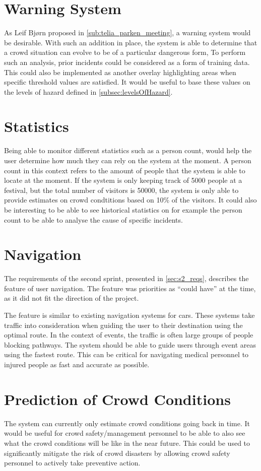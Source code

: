 \section{Warning System}
As Leif Bjørn proposed in \cref{sub:telia_parken_meeting}, a warning system would be desirable. With such an addition in place, the system is able to determine that a crowd situation can  evolve to be of a particular dangerous form, To perform such an analysis, prior incidents could be considered as a form of training data. This could also be implemented as another overlay highlighting areas when specific threshold values are satisfied. It would be useful to base these values on the levels of hazard defined in \cref{subsec:levelsOfHazard}.

\section{Statistics}
Being able to monitor different statistics such as a person count, would help the user determine how much they can rely on the system at the moment. A person count in this context refers to the amount of people that the system is able to locate at the moment. If the system is only keeping track of 5000 people at a festival, but the total number of visitors is 50000, the system is only able to provide estimates on crowd condtitions based on 10\% of the visitors. It could also be interesting to be able to see historical statistics on for example the person count to be able to analyse the cause of specific incidents.

\section{Navigation}
The requirements of the second sprint, presented in \cref{sec:s2_reqs}, describes the feature of user navigation. The feature was priorities as \enquote{could have} at the time, as it did not fit the direction of the project.

The feature is similar to existing navigation systems for cars. These systems take traffic into consideration when guiding the user to their destination using the optimal route. In the context of events, the traffic is often large groups of people blocking pathways. The system should be able to guide users through event areas using the fastest route. This can be critical for navigating medical personnel to injured people as fast and accurate as possible.

\section{Prediction of Crowd Conditions}
The system can currently only estimate crowd conditions going back in time. It would be useful for crowd safety/management personnel to be able to also see what the crowd conditions will be like in the near future. This could be used to significantly mitigate the risk of crowd disasters by allowing crowd safety personnel to actively take preventive action.

